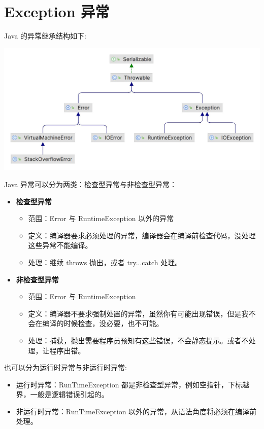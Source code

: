 \section{Exception 异常}

Java 的异常继承结构如下:

\includegraphics[width=0.9\linewidth]{../../imgs/Throwable.jpg}

Java 异常可以分为两类：检查型异常与非检查型异常：
\begin{itemize}
    \item \textbf{检查型异常}
    \begin{itemize}
        \item 范围：Error 与 RuntimeException 以外的异常
        \item 定义：编译器要求必须处理的异常，编译器会在编译前检查代码，没处理这些异常不能编译。
        \item 处理：继续 throws 抛出，或者 try...catch 处理。
    \end{itemize}
    \item \textbf{非检查型异常}
    \begin{itemize}
        \item 范围：Error 与 RuntimeException
        \item 定义：编译器不要求强制处置的异常，虽然你有可能出现错误，但是我不会在编译的时候检查，没必要，也不可能。
        \item 处理：捕获，抛出需要程序员预知有这些错误，不会静态提示。或者不处理，让程序出错。
    \end{itemize}
\end{itemize}

也可以分为运行时异常与非运行时异常:

\begin{itemize}
    \item 运行时异常：RunTimeException 都是非检查型异常，例如空指针，下标越界，一般是逻辑错误引起的。
    \item 非运行时异常：RunTimeException 以外的异常，从语法角度将必须在编译前处理。
\end{itemize}

